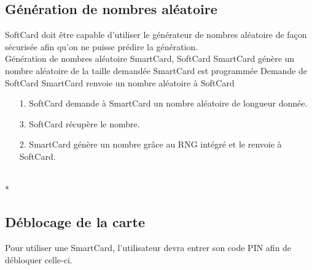 \documentclass[a4paper,11pt,french]{article}
\begin{document}
\subsection{Génération de nombres aléatoire}
SoftCard doit être capable d'utiliser le générateur de nombres aléatoire de façon 
sécurisée afin qu'on ne puisse prédire la génération.\\

\fiche
	{Génération de nombres aléatoire}
	{SmartCard, SoftCard}
    {SmartCard génère un nombre aléatoire de la taille demandée}
	{SmartCard est programmée}
    {Demande de SoftCard}
    {SmartCard renvoie un nombre aléatoire à SoftCard}
	{\begin{itemize}
	    \item[]
	  \item[1.] SoftCard demande à SmartCard un nombre aléatoire de longueur 
          donnée.
      \item[3.] SoftCard récupère le nombre.
	\end{itemize}
	}
	{\begin{itemize}
        \item[]
        \item[2.] SmartCard génère un nombre grâce au RNG intégré et le renvoie
            à SoftCard.
	\end{itemize}
    }
	{}
\flots
    {}
    {}
    {}
\\*

\subsection{Déblocage de la carte}
Pour utiliser une SmartCard, l'utilisateur devra entrer son code PIN afin de 
\og{}débloquer \fg{} celle-ci.\\
\end{document}
